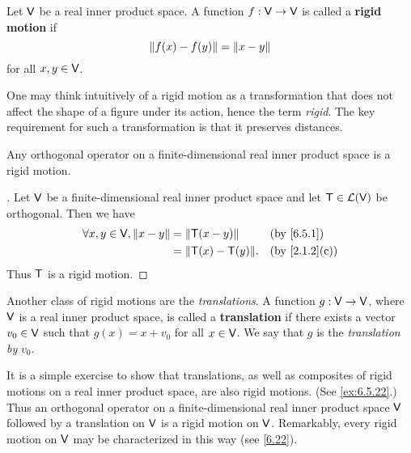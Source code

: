 \begin{defn}\label{6.5.14}
  Let \(\mathsf{V}\) be a real inner product space.
  A function \(f : \mathsf{V} \to \mathsf{V}\) is called a \textbf{rigid motion} if
  \[
    \left\lVert f(x) - f(y)\right\rVert = \left\lVert x - y\right\rVert
  \]
  for all \(x, y \in \mathsf{V}\).
\end{defn}

\begin{note}
  One may think intuitively of a rigid motion as a transformation that does not affect the shape of a figure under its action, hence the term \emph{rigid}.
  The key requirement for such a transformation is that it preserves distances.
\end{note}

\begin{eg}\label{6.5.15}
  Any orthogonal operator on a finite-dimensional real inner product space is a rigid motion.
\end{eg}

\begin{proof}[]
  Let \(\mathsf{V}\) be a finite-dimensional real inner product space and let \(\mathsf{T} \in \mathcal{L}(\mathsf{V})\) be orthogonal.
  Then we have
  \begin{align*}
    \forall x, y \in \V, \norm{x - y} & = \norm{\T(x - y)}      &  & \by{6.5.1}    \\
                                      & = \norm{\T(x) - \T(y)}. &  & \by{2.1.2}[c]
  \end{align*}
  Thus \(\mathsf{T}\) is a rigid motion.
\end{proof}

\begin{defn}\label{6.5.16}
  Another class of rigid motions are the \emph{translations}.
  A function \(g : \mathsf{V} \to \mathsf{V}\), where \(\mathsf{V}\) is a real inner product space, is called a \textbf{translation} if there exists a vector \(v_0 \in \mathsf{V}\) such that \(g(x) = x + v_0\) for all \(x \in \mathsf{V}\).
  We say that \(g\) is the \emph{translation by} \(v_0\).
\end{defn}

\begin{note}
  It is a simple exercise to show that translations, as well as composites of rigid motions on a real inner product space, are also rigid motions.
  (See \cref{ex:6.5.22}.)
  Thus an orthogonal operator on a finite-dimensional real inner product space \(\mathsf{V}\) followed by a translation on \(\mathsf{V}\) is a rigid motion on \(\mathsf{V}\).
  Remarkably, every rigid motion on \(\mathsf{V}\) may be characterized in this way (see \cref{6.22}).
\end{note}

